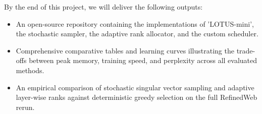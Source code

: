 \documentclass[conference]{IEEEtran}
\begin{document}
By the end of this project, we will deliver the following outputs:
\begin{itemize}
    \item An open-source repository containing the implementations of 'LOTUS-mini', the stochastic sampler, the adaptive rank allocator, and the custom scheduler.
    \item Comprehensive comparative tables and learning curves illustrating the trade-offs between peak memory, training speed, and perplexity across all evaluated methods.
    \item An empirical comparison of stochastic singular vector sampling and adaptive layer-wise ranks against deterministic greedy selection on the full RefinedWeb rerun.
\end{itemize}



\end{document}
